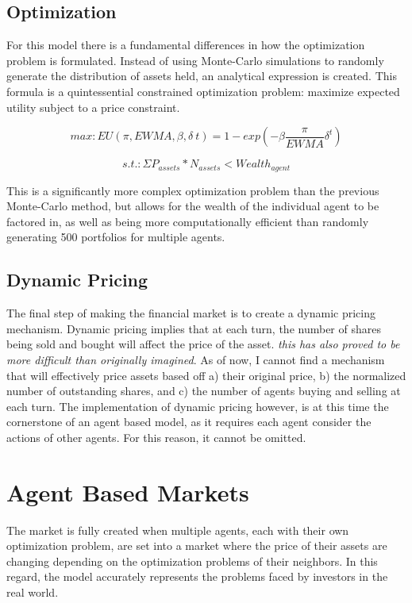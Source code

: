 \documentclass{article}
\begin{document}
\subsection{Optimization}
For this model there is a fundamental differences in how the optimization problem is formulated. Instead of using Monte-Carlo simulations to randomly generate the distribution of assets held, an analytical expression is created. This formula is a quintessential constrained optimization problem: maximize expected utility subject to a price constraint. 


\begin{equation}
	 max:EU(\pi, EWMA, \beta, \delta\ t) = 1 - exp(-\beta \frac{\pi}{EWMA}\delta^t)
\end{equation}

\begin{equation}
	s.t.: \Sigma{P_{assets} * N_{assets}} < Wealth_{agent}
\end{equation}

This is a significantly more complex optimization problem than the previous Monte-Carlo method, but allows for the wealth of the individual agent to be factored in, as well as being more computationally efficient than randomly generating 500 portfolios for multiple agents. 

\subsection{Dynamic Pricing}
The final step of making the financial market is to create a dynamic pricing mechanism. Dynamic pricing implies that at each turn, the number of shares being sold and bought will affect the price of the asset. \emph{this has also proved to be more difficult than originally imagined}. As of now, I cannot find a mechanism that will effectively price assets based off a) their original price, b) the normalized number of outstanding shares, and c) the number of agents buying and selling at each turn. The implementation of dynamic pricing however, is at this time the cornerstone of an agent based model, as it requires each agent consider the actions of other agents. For this reason, it cannot be omitted.


\section{Agent Based Markets}
The market is fully created when multiple agents, each with their own optimization problem, are set into a market where the price of their assets are changing depending on the optimization problems of their neighbors. In this regard, the model accurately represents the problems faced by investors in the real world. 
\end{document}
